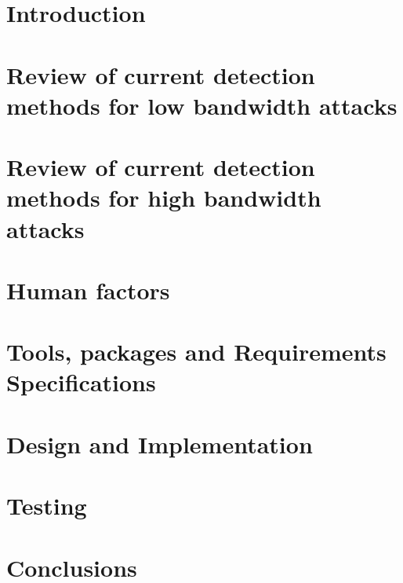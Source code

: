 \documentclass[11pt,twoside]{book}
\begin{document}
\frontmatter




\tableofcontents
\listoffigures
\mainmatter
\chapter{Introduction}

\chapter{Review of current detection methods for low bandwidth attacks}

\chapter{Review of current detection methods for high bandwidth attacks}
 
\chapter{Human factors}\label{Human factors}

\chapter{Tools, packages and Requirements Specifications}
 \label{Errorcodes}
\chapter{Design and Implementation}

\chapter{Testing}

\chapter{Conclusions}

\printbibliography
\appendix

\end{document}
